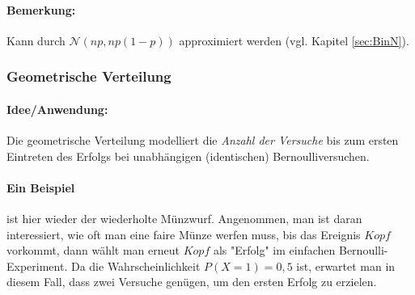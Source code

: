 \documentclass[a4paper]{article}
\begin{document}
\paragraph{Bemerkung:} Kann durch $\mathcal{N}(np,np(1-p))$ approximiert werden (vgl. Kapitel \ref{sec:BinN}).\\

\noindent {}

\subsubsection{Geometrische Verteilung} \label{sec:Geo}

\paragraph{Idee/Anwendung:} Die geometrische Verteilung modelliert die \textit{Anzahl der Versuche} bis zum ersten Eintreten des Erfolgs bei unabhängigen (identischen) Bernoulliversuchen.

\paragraph{Ein Beispiel} ist hier wieder der wiederholte Münzwurf. Angenommen, man ist daran interessiert, wie oft man eine faire Münze werfen muss, bis das Ereignis $Kopf$ vorkommt, dann wählt man erneut $Kopf$ als "Erfolg" im einfachen Bernoulli-Experiment. Da die Wahrscheinlichkeit $P(X=1)=0,5$ ist, erwartet man in diesem Fall, dass zwei Versuche genügen, um den ersten Erfolg zu erzielen.
\end{document}
